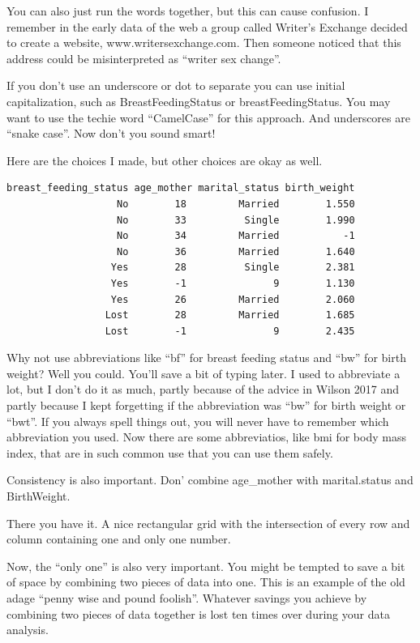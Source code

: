 \documentclass[
  letterpaper,
  DIV=11,
  numbers=noendperiod]{scrreprt}
\begin{document}
You can also just run the words together, but this can cause confusion.
I remember in the early data of the web a group called Writer's Exchange
decided to create a website, www.writersexchange.com. Then someone
noticed that this address could be misinterpreted as ``writer sex
change''.

If you don't use an underscore or dot to separate you can use initial
capitalization, such as BreastFeedingStatus or breastFeedingStatus. You
may want to use the techie word ``CamelCase'' for this approach. And
underscores are ``snake case''. Now don't you sound smart!

Here are the choices I made, but other choices are okay as well.

\begin{verbatim}
breast_feeding_status age_mother marital_status birth_weight
                   No        18         Married        1.550
                   No        33          Single        1.990
                   No        34         Married           -1
                   No        36         Married        1.640
                  Yes        28          Single        2.381
                  Yes        -1               9        1.130
                  Yes        26         Married        2.060
                 Lost        28         Married        1.685
                 Lost        -1               9        2.435
\end{verbatim}

Why not use abbreviations like ``bf'' for breast feeding status and
``bw'' for birth weight? Well you could. You'll save a bit of typing
later. I used to abbreviate a lot, but I don't do it as much, partly
because of the advice in Wilson 2017 and partly because I kept
forgetting if the abbreviation was ``bw'' for birth weight or ``bwt''.
If you always spell things out, you will never have to remember which
abbreviation you used. Now there are some abbreviatios, like bmi for
body mass index, that are in such common use that you can use them
safely.

Consistency is also important. Don' combine age\_mother with
marital.status and BirthWeight.

There you have it. A nice rectangular grid with the intersection of
every row and column containing one and only one number.

Now, the ``only one'' is also very important. You might be tempted to
save a bit of space by combining two pieces of data into one. This is an
example of the old adage ``penny wise and pound foolish''. Whatever
savings you achieve by combining two pieces of data together is lost ten
times over during your data analysis.
\end{document}

